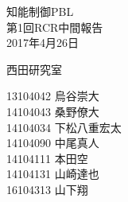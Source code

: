 \begin{titlepage}

  \vspace*{25mm}

  \begin{center}
    {\huge 知能制御PBL\\}
    \vspace{5mm}
    {\Huge 第1回RCR中間報告\\}
    \vspace{20mm}
    {\Large 2017年4月26日}

    \vspace{25mm}

    {\LARGE 西田研究室\\}

    \vspace{10mm}

    {\Large
   13104042 烏谷崇大　　\\
   14104043 桑野僚大　　\\
   14104034 下松八重宏太\\
   14104090 中尾真人　　\\
   14104111 本田空　　　\\
   14104131 山崎達也　　\\
   16104313 山下翔　　　\\
}

  \end{center}

\end{titlepage}
